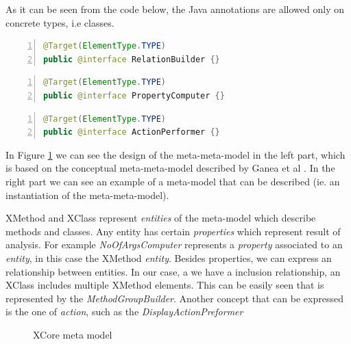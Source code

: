         As it can be seen from the code below, the {J}ava annotations are allowed only on concrete types, i.e classes. 

\small
\begin{lstlisting}[language=Java, numbers=left]
@Target(ElementType.TYPE)
public @interface RelationBuilder {}   
\end{lstlisting}
\normalsize{} \label{codeSection:RelationBuilder}
                          
\small
\begin{lstlisting}[language=Java,numbers=left]
@Target(ElementType.TYPE)
public @interface PropertyComputer {}
\end{lstlisting}
\normalsize{} \label{codeSection:PropertyComputer} 

\small
\begin{lstlisting}[language=Java, numbers=left]
@Target(ElementType.TYPE)
public @interface ActionPerformer {}
\end{lstlisting}
\normalsize{} \label{codeSection:ActionPerformer} 


        In Figure \ref{fig:XMetaModel} we can see the design of the meta-meta-model in the left part, which is based on the conceptual meta-meta-model described
by Ganea et al \cite{paper:ganea}. In the right part we can see an example of a meta-model that can be described (ie. an instantiation of the meta-meta-model). 

        XMethod and XClass represent \textit{entities} of the meta-model which describe methods and classes. Any entity has certain \textit{properties} which represent
result of analysis. For example \textit{NoOfArgsComputer} represents a \textit{property } associated to an \textit{entity}, in this case the XMethod \textit{entity}.
Besides properties, we can express an relationship between entities. In our case, a we have a inclusion relationship, an XClass includes multiple XMethod elements. This can
be easily seen that is represented by the \textit{MethodGroupBuilder}. Another concept that can be expressed is the one of \textit{action}, such as the \textit{DisplayActionPreformer}


        \begin{figure}
        \centering
        \caption{XCore meta model \cite{paper:xcore}}
        \label{fig:XMetaModel}
        \end{figure}

